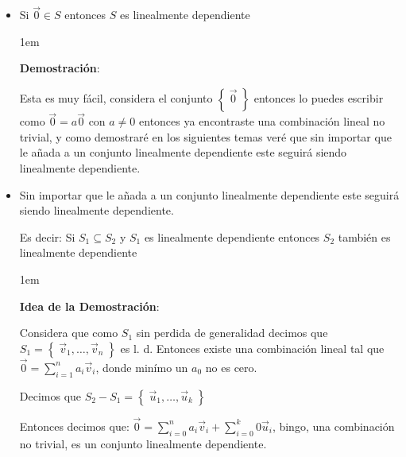 \documentclass[12pt, fleqn]{report}                             %
\newenvironment{SmallIndentation}[1][0.75em]                    %
        {\begin{adjustwidth}{#1}{}\begin{footnotesize}}             %
        {\end{footnotesize}\end{adjustwidth}}                       %
\theoremstyle{break}                                            %
\newcommand{\Set}[1]    {\left\{ \; #1 \; \right\}}             %
\begin{document}
            \begin{itemize}
                
                \item 
                    Si $\vec 0 \in S$ entonces $S$ es linealmente dependiente

                    \begin{SmallIndentation}[1em]
                        \textbf{Demostración}:
                        
                        Esta es muy fácil, considera el conjunto $\Set{\vec 0}$ entonces lo puedes
                        escribir como $\vec 0 = a \vec 0$ con $a \neq 0$ entonces ya encontraste 
                        una combinación lineal no trivial, y como demostraré en los siguientes temas
                        veré que sin importar que le añada a un conjunto linealmente dependiente este
                        seguirá siendo linealmente dependiente.
                    
                    \end{SmallIndentation}
                        

                \item 
                    Sin importar que le añada a un conjunto linealmente dependiente este
                    seguirá siendo linealmente dependiente.

                    Es decir:
                    Si $S_1 \subseteq S_2$ y $S_1$ es linealmente dependiente entonces
                    $S_2$ también es linealmente dependiente

                    \begin{SmallIndentation}[1em]
                        \textbf{Idea de la Demostración}:
                        
                        Considera que como $S_1$ sin perdida de generalidad decimos que 
                        $S_1 = \Set{\vec v_1, \dots, \vec v_n}$ es l. d. Entonces existe una combinación lineal
                        tal que $\vec 0 = \sum_{i=1}^n a_i \vec v_i$, donde minímo un $a_0$ no es cero.

                        Decimos que $S_2 - S_1 = \Set{\vec u_1, \dots, \vec u_k}$

                        Entonces decimos que:
                        $\vec 0 = \sum_{i=0}^n a_i \vec v_i +  \sum_{i=0}^k 0 \vec u_i$, bingo, una combinación
                        no trivial, es un conjunto linealmente dependiente.
                    

\end{SmallIndentation}
\end{itemize}
\end{document}
